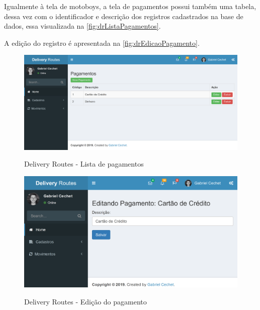 \newpage
Igualmente à tela de motoboys, a tela de pagamentos possui também uma tabela, dessa vez com o identificador e descrição dos registros cadastrados na base de dados, essa visualizada na \autoref{fig:drListaPagamentos}. 

A edição do registro é apresentada na \autoref{fig:drEdicaoPagamento}.

\begin{figure}[H]
    \centering
    \caption{Delivery Routes - Lista de pagamentos}
    \includegraphics[width=1.0\textwidth]{./dados/figuras/fig20}
    \label{fig:drListaPagamentos}
\end{figure}

\begin{figure}[H]
    \centering
    \caption{Delivery Routes - Edição do pagamento}
    \includegraphics[width=1.0\textwidth]{./dados/figuras/fig21}
    \label{fig:drEdicaoPagamento}
\end{figure}
